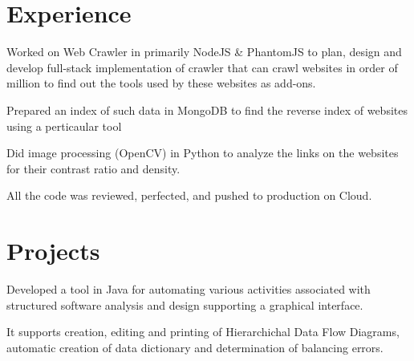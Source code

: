 \documentclass[a4paper]{deedy-resume} %
\begin{document}
\begin{minipage}[t]{0.66\textwidth} %


\section{Experience}


\vspace{\topsep} %
\begin{tightitemize}
\item Worked on Web Crawler in primarily NodeJS \& PhantomJS to plan, design and develop full-stack implementation of crawler that can crawl websites in order of million to find out the tools used by these websites as add-ons.
\item Prepared an index of such data in MongoDB to find the reverse index of websites using a perticaular tool
\item Did image processing (OpenCV) in Python to analyze the links on the websites for their contrast ratio and density.
\item All the code was reviewed, perfected, and pushed to production on Cloud.
\end{tightitemize}

\sectionspace %


\section{Projects}


\begin{tightitemize}
\item Developed a tool in Java for automating various activities associated with structured software analysis and design supporting a graphical interface.
\item It supports creation, editing and printing of Hierarchichal Data Flow Diagrams, automatic creation of data dictionary and determination of balancing errors. 
\end{tightitemize}
\sectionspace %


\end{minipage}
\end{document}
